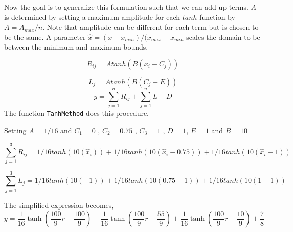 \documentclass[a4paper]{article}
\begin{document}
Now the goal is to generalize this formulation such that we can add up terms.
$A$ is determined by setting a maximum amplitude for each $tanh$ function by
$A = A_{max}/n$. Note that amplitude can be different for each term but is chosen
to be the same. A parameter $\hat{x} = (x - x_{min})/ (x_{max} - x_{min}$ scales the domain to be between the  
minimum and maximum bounds.


\begin{equation}
    R_{ij} = A tanh(B(x_i-C_j)) 
    \label{eqn:1}
\end{equation}

\begin{equation}
    L_{j} = A tanh(B(C_j-E)) 
    \label{eqn:2}
\end{equation}
\begin{equation}
    y = \sum_{j = 1}^{n}  R_{ij} + \sum_{j = 1}^{n}L + D
    \label{eqn:3}
\end{equation}
The function \verb|TanhMethod| does this procedure. 

Setting $A = 1/16$ and $C_1  = 0$ , $C_2 = 0.75$ , $C_3 = 1$ , $D = 1$, $E = 1$  and 
$B = 10$


\begin{equation}
    \sum_{j = 1}^{3} R_{ij} = 1/16 tanh(10(\hat{x}_i))  + 1/16 tanh(10(\hat{x}_i-0.75)) + 1/16 tanh(10(\hat{x}_i-1))
    \label{eqn:1}
\end{equation}

\begin{equation}
    \sum_{j = 1}^{3} L_{j} = 1/16 tanh(10(-1))  + 1/16 tanh(10(0.75 - 1)) + 1/16 tanh(10(1-1))
    \label{eqn:1}
\end{equation}

The simplified expression becomes,
\begin{equation}
    y = \frac{1}{16}\tanh\left(\frac{100}{9}r - \frac{100}{9}\right) + \frac{1}{16}\tanh\left(\frac{100}{9}r -\frac{55}{9}\right) + \frac{1}{16}\tanh\left(\frac{100}{9}r -\frac{10}{9} \right) + \frac{7}{8}
\end{equation}


\begin{figure}
    \centering
    \resizebox{\columnwidth}{!}{

}
\end{figure}
\end{document}
